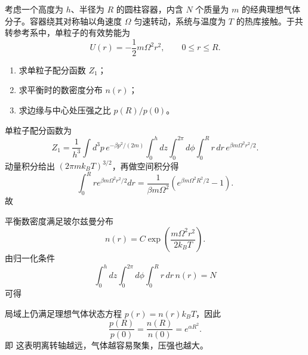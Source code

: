 \begin{question}
考虑一个高度为 $h$、半径为 $R$ 的圆柱容器，内含 $N$ 个质量为 $m$ 的经典理想气体分子。容器绕其对称轴以角速度 $\Omega$ 匀速转动，系统与温度为 $T$ 的热库接触。于共转参考系中，单粒子的有效势能为
\[
U(r)=-\frac12 m\Omega^2 r^2,
\qquad 0\le r\le R.
\]

\begin{enumerate}[label=(\arabic*),leftmargin=2.5em]
  \item 求单粒子配分函数 $Z_1$；
  \item 求平衡时的数密度分布 $n(r)$；
  \item 求边缘与中心处压强之比 $p(R)/p(0)$。
\end{enumerate}

\begin{solution}
单粒子配分函数为
\[
Z_1=\frac{1}{h^3}\int d^3p\,e^{-\beta p^2/(2m)}\int_0^h dz\int_0^{2\pi}d\phi\int_0^R r\,dr\,e^{\beta m\Omega^2 r^2/2}.
\]
动量积分给出 $(2\pi m k_B T)^{3/2}$，再做空间积分得
\[
\int_0^R r e^{\beta m\Omega^2 r^2/2}dr
=\frac{1}{\beta m\Omega^2}\left(e^{\beta m\Omega^2 R^2/2}-1\right).
\]
故

平衡数密度满足玻尔兹曼分布
\[
n(r)=C\exp\left(\frac{m\Omega^2 r^2}{2k_B T}\right).
\]
由归一化条件
\[
\int_0^h dz\int_0^{2\pi}d\phi\int_0^R r\,dr\,n(r)=N
\]
可得

局域上仍满足理想气体状态方程 $p(r)=n(r)k_B T$，因此
\[
\frac{p(R)}{p(0)}=\frac{n(R)}{n(0)}=e^{\alpha R^2}.
\]
即
这表明离转轴越远，气体越容易聚集，压强也越大。
\end{solution}
\end{question}

